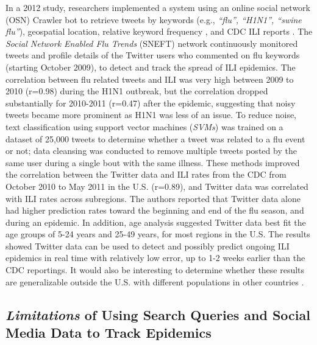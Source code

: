 \documentclass[sigconf]{acmart}
\begin{document}
In a 2012 study, researchers implemented a system using an online social network (OSN)
Crawler bot to retrieve tweets by keywords (e.g., {\it ``flu'', ``H1N1'', ``swine flu''}), 
geospatial location, relative keyword frequency , and CDC ILI reports \cite{achrekar12}. 
The {\it Social Network Enabled Flu Trends} (SNEFT) network continuously monitored tweets 
and profile details of the Twitter users who commented on flu keywords (starting October 
2009), to detect and track the spread of ILI epidemics. The correlation between flu related 
tweets and ILI was very high between 2009 to 2010 (r=0.98) during the H1N1 outbreak, but 
the correlation dropped substantially for 2010-2011 (r=0.47) after the epidemic, suggesting 
that noisy tweets became more prominent as H1N1 was less of an issue. To reduce noise, text 
classification using support vector machines ({\it SVMs}) was trained on a dataset of 
25,000 tweets to determine whether a tweet was related to a flu event or not; data cleansing 
was conducted to remove multiple tweets posted by the same user during a single bout with 
the same illness. These methods improved the correlation between the Twitter data and ILI 
rates from the CDC from October 2010 to May 2011 in the U.S. (r=0.89), and Twitter data was 
correlated with ILI rates across subregions. The authors reported that Twitter data alone 
had higher prediction rates toward the beginning and end of the flu season, and during an 
epidemic. In addition, age analysis suggested Twitter data best fit the age groups of 5-24 
years and 25-49 years,  for most regions in the U.S. The results showed Twitter data can be 
used to detect and possibly predict ongoing ILI epidemics in real time with relatively 
low error, up to 1-2 weeks earlier than the CDC reportings. It would also be interesting to 
determine whether these results are generalizable outside the U.S. with different 
populations in other countries \cite{yuan13}.


\subsection{{\it Limitations} of Using Search Queries and Social Media Data to Track Epidemics}
\end{document}
